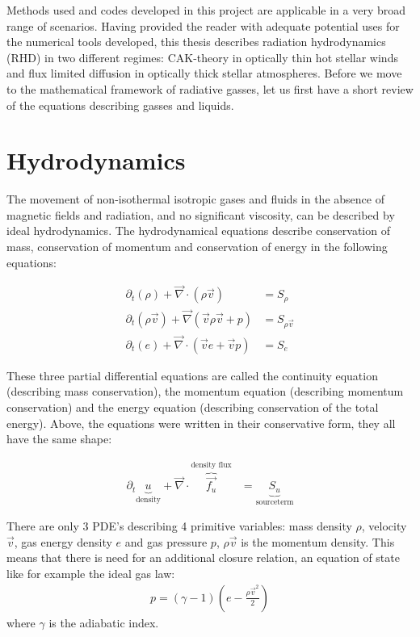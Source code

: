 Methods used and codes developed in this project are applicable in a very broad range of scenarios. Having provided the reader with adequate potential uses for the numerical tools developed, this thesis describes radiation hydrodynamics (RHD) in two different regimes: CAK-theory in optically thin hot stellar winds and flux limited diffusion in optically thick stellar atmospheres. Before we move to the mathematical framework of radiative gasses, let us first have a short review of the equations describing gasses and liquids.\\

\section{Hydrodynamics}
The movement of non-isothermal isotropic gases and fluids in the absence of magnetic fields and radiation, and no significant viscosity, can be described by ideal hydrodynamics. The hydrodynamical equations describe conservation of mass, conservation of momentum and conservation of energy in the following equations:

\begin{align}
 \partial_t \left(\rho \right) + \vec{\nabla} \cdot \left( \rho \vec{v}  \right) &= S_\rho \label{eq: hd_rho}\\
 \partial_t \left(\rho \vec{v} \right) + \vec{\nabla} \left( \vec{v} \rho \vec{v} + p \right) &= S_{\rho \vec{v}} \label{eq: hd_mom}\\
 \partial_t \left(e \right) + \vec{\nabla} \cdot \left( \vec{v} e + \vec{v} p \right) &= S_e \label{eq: hd_e}
\end{align}

These three partial differential equations are called the continuity equation (describing mass conservation), the momentum equation (describing momentum conservation) and the energy equation (describing conservation of the total energy). Above, the equations were written in their conservative form, they all have the same shape:

\begin{align}
	\partial_t \underbrace{u}_\text{density} + \vec{\nabla} \cdot \overbrace{\vec{f_u}}^\text{density flux} &= \underbrace{S_u}_\text{sourceterm} \label{eq: conservative}
\end{align}

There are only 3 PDE's describing 4 primitive variables: mass density $\rho$, velocity $\vec{v}$, gas energy density $e$ and gas pressure $p$, $\rho \vec{v}$ is the momentum density. This means that there is need for an additional closure relation, an equation of state like for example the ideal gas law:
\begin{align}
	p = (\gamma - 1) \left(e - \frac{\rho \vec{v}^2}{2} \right) \label{gas_closing}
\end{align}
where $\gamma$ is the adiabatic index.\\

